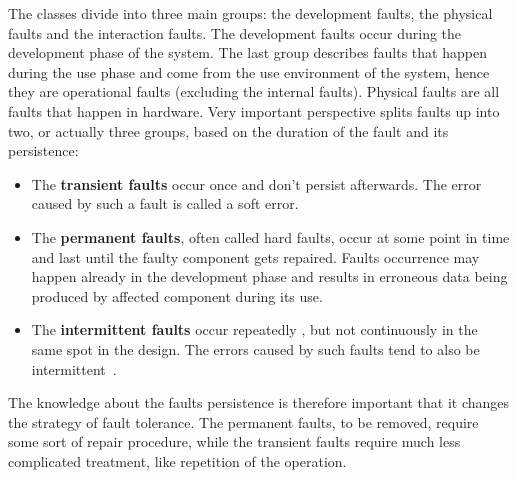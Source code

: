 The classes divide into three main groups: the development faults, the physical faults and the interaction faults. The development faults occur during the development phase of the system. The last group describes faults that happen during the use phase and come from the use environment of the system, hence they are operational faults (excluding the internal faults). Physical faults are all faults that happen in hardware.
Very important perspective splits faults up into two, or actually three groups, based on the duration of the fault and its persistence:
\begin{itemize}
    \item The \textbf{transient faults} occur once and don't persist afterwards. The error caused by such a fault is called a soft error.
    \item The \textbf{permanent faults}, often called hard faults, occur at some point in time and last until the faulty component gets repaired. Faults occurrence may happen already in the development phase and results in erroneous data being produced by affected component during its use. 
    \item The \textbf{intermittent faults} occur repeatedly , but not continuously in the same spot in the design. The errors caused by such faults tend to also be intermittent~\cite{book:Sorin}.
\end{itemize}
The knowledge about the faults persistence is therefore important that it changes the strategy of fault tolerance. The permanent faults, to be removed, require some sort of repair procedure, while the transient faults require much less complicated treatment, like repetition of the operation.

